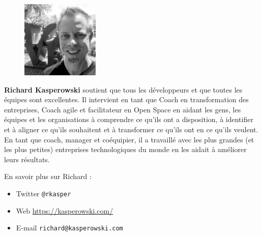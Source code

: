 \documentclass[paper=6in:9in,pagesize=pdftex,headinclude=on,footinclude=on,12pt]{scrbook}
\begin{document}
\begin{figure}
  \vspace{-2em}
  \begin{center}
    \includegraphics[width=10em]{rkasper_gs.png}
  \end{center}
  \vspace{-2em}
\end{figure}

\textbf{Richard Kasperowski} soutient que tous les développeurs et que toutes les équipes sont excellentes. Il intervient
en tant que Coach en transformation des entreprises, Coach agile et facilitateur en Open Space en aidant les gens,
les équipes et les organisations à comprendre ce qu'ils ont a disposition, à identifier et à aligner ce qu'ils souhaitent
et à transformer ce qu'ils ont en ce qu'ils veulent. En tant que coach, manager et coéquipier, il a travaillé avec les
plus grandes (et les plus petites) entreprises technologiques du monde en les aidait à améliorer leurs résultats.

En savoir plus sur Richard :
\begin{itemize}
	\item Twitter \texttt{@rkasper}
	\item Web \url{https://kasperowski.com/}
	\item E-mail \texttt{richard@kasperowski.com}
\end{itemize}
\end{document}
